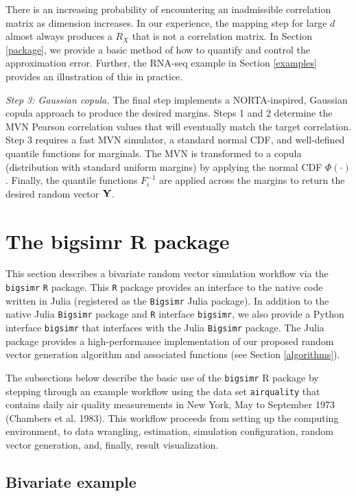 \documentclass{article}
\begin{document}
There is an increasing probability of encountering an inadmissible
correlation matrix as dimension increases. In our experience, the
mapping step for large \(d\) almost always produces a \(R_X\) that is
not a correlation matrix. In Section \ref{package}, we provide a basic
method of how to quantify and control the approximation error. Further,
the RNA-seq example in Section \ref{examples} provides an illustration
of this in practice.

\emph{Step 3: Gaussian copula.} The final step implements a
NORTA-inspired, Gaussian copula approach to produce the desired margins.
Steps 1 and 2 determine the MVN Pearson correlation values that will
eventually match the target correlation. Step 3 requires a fast MVN
simulator, a standard normal CDF, and well-defined quantile functions
for marginals. The MVN is transformed to a copula (distribution with
standard uniform margins) by applying the normal CDF \(\Phi(\cdot)\).
Finally, the quantile functions \(F_i^{-1}\) are applied across the
margins to return the desired random vector \({\bf Y}\).

\hypertarget{the-bigsimr-r-package}{%
\section{The bigsimr R package}\label{the-bigsimr-r-package}}

This section describes a bivariate random vector simulation workflow via
the \texttt{bigsimr} \texttt{R} package. This \texttt{R} package
provides an interface to the native code written in Julia (registered as
the \texttt{Bigsimr} Julia package). In addition to the native Julia
\texttt{Bigsimr} package and \texttt{R} interface \texttt{bigsimr}, we
also provide a Python interface \texttt{bigsimr} that interfaces with
the Julia \texttt{Bigsimr} package. The Julia package provides a
high-performance implementation of our proposed random vector generation
algorithm and associated functions (see Section \ref{algorithms}).

The subsections below describe the basic use of the \texttt{bigsimr} R
package by stepping through an example workflow using the data set
\texttt{airquality} that contains daily air quality measurements in New
York, May to September 1973 (Chambers et al. 1983). This workflow
proceeds from setting up the computing environment, to data wrangling,
estimation, simulation configuration, random vector generation, and,
finally, result visualization.

\hypertarget{bivariate-example}{%
\subsection{Bivariate example}\label{bivariate-example}}
\end{document}
